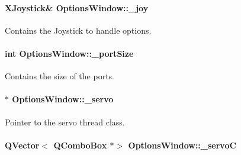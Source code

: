\paragraph[{\+\_\+joy}]{\setlength{\rightskip}{0pt plus 5cm}X\+Joystick\& Options\+Window\+::\+\_\+joy\hspace{0.3cm}{\ttfamily [private]}}\label{a00006_a1bf846ab681ab245f70adac30999947c}


Contains the Joystick to handle options. 

\hypertarget{a00006_a9bd4dccc7a544b1db78dc8cf330b88f6}{}
\paragraph[{\+\_\+port\+Size}]{\setlength{\rightskip}{0pt plus 5cm}int Options\+Window\+::\+\_\+port\+Size\hspace{0.3cm}{\ttfamily [private]}}\label{a00006_a9bd4dccc7a544b1db78dc8cf330b88f6}


Contains the size of the ports. 

\hypertarget{a00006_acba1566fea3f831000d5e1c1edc3e776}{}
\paragraph[{\+\_\+servo}]{$\ast$ Options\+Window\+::\+\_\+servo\hspace{0.3cm}{\ttfamily [private]}}\label{a00006_acba1566fea3f831000d5e1c1edc3e776}


Pointer to the servo thread class. 

\hypertarget{a00006_a45137fbf71bbee10e171019c913b88b7}{}
\paragraph[{\+\_\+servo\+C}]{\setlength{\rightskip}{0pt plus 5cm}Q\+Vector$<$ Q\+Combo\+Box $\ast$$>$ Options\+Window\+::\+\_\+servo\+C\hspace{0.3cm}{\ttfamily [private]}}\label{a00006_a45137fbf71bbee10e171019c913b88b7}


